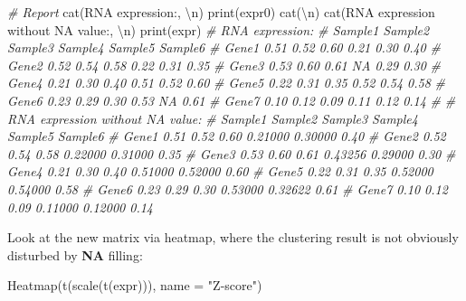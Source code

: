 \documentclass[
  12pt,
]{book}
\newenvironment{Shaded}{\begin{snugshade}}{\end{snugshade}}
\newcommand{\AttributeTok}[1]{\textcolor[rgb]{0.77,0.63,0.00}{#1}}
\newcommand{\CommentTok}[1]{\textcolor[rgb]{0.56,0.35,0.01}{\textit{#1}}}
\newcommand{\FunctionTok}[1]{\textcolor[rgb]{0.00,0.00,0.00}{#1}}
\newcommand{\NormalTok}[1]{#1}
\newcommand{\SpecialCharTok}[1]{\textcolor[rgb]{0.00,0.00,0.00}{#1}}
\newcommand{\StringTok}[1]{\textcolor[rgb]{0.31,0.60,0.02}{#1}}
\begin{document}
\begin{Shaded}
\begin{Highlighting}[]
\CommentTok{\# Report}
\FunctionTok{cat}\NormalTok{(}\StringTok{\textquotesingle{}RNA expression:\textquotesingle{}}\NormalTok{, }\StringTok{\textquotesingle{}}\SpecialCharTok{\textbackslash{}n}\StringTok{\textquotesingle{}}\NormalTok{)}
\FunctionTok{print}\NormalTok{(expr0)}
\FunctionTok{cat}\NormalTok{(}\StringTok{\textquotesingle{}}\SpecialCharTok{\textbackslash{}n}\StringTok{\textquotesingle{}}\NormalTok{)}
\FunctionTok{cat}\NormalTok{(}\StringTok{\textquotesingle{}RNA expression without NA value:\textquotesingle{}}\NormalTok{, }\StringTok{\textquotesingle{}}\SpecialCharTok{\textbackslash{}n}\StringTok{\textquotesingle{}}\NormalTok{)}
\FunctionTok{print}\NormalTok{(expr)}
\CommentTok{\# RNA expression: }
\CommentTok{\#       Sample1 Sample2 Sample3 Sample4 Sample5 Sample6}
\CommentTok{\# Gene1    0.51    0.52    0.60    0.21    0.30    0.40}
\CommentTok{\# Gene2    0.52    0.54    0.58    0.22    0.31    0.35}
\CommentTok{\# Gene3    0.53    0.60    0.61      NA    0.29    0.30}
\CommentTok{\# Gene4    0.21    0.30    0.40    0.51    0.52    0.60}
\CommentTok{\# Gene5    0.22    0.31    0.35    0.52    0.54    0.58}
\CommentTok{\# Gene6    0.23    0.29    0.30    0.53      NA    0.61}
\CommentTok{\# Gene7    0.10    0.12    0.09    0.11    0.12    0.14}
\CommentTok{\# }
\CommentTok{\# RNA expression without NA value: }
\CommentTok{\#       Sample1 Sample2 Sample3 Sample4 Sample5 Sample6}
\CommentTok{\# Gene1    0.51    0.52    0.60 0.21000 0.30000    0.40}
\CommentTok{\# Gene2    0.52    0.54    0.58 0.22000 0.31000    0.35}
\CommentTok{\# Gene3    0.53    0.60    0.61 0.43256 0.29000    0.30}
\CommentTok{\# Gene4    0.21    0.30    0.40 0.51000 0.52000    0.60}
\CommentTok{\# Gene5    0.22    0.31    0.35 0.52000 0.54000    0.58}
\CommentTok{\# Gene6    0.23    0.29    0.30 0.53000 0.32622    0.61}
\CommentTok{\# Gene7    0.10    0.12    0.09 0.11000 0.12000    0.14}
\end{Highlighting}
\end{Shaded}

Look at the new matrix via heatmap, where the clustering result is not obviously disturbed by \textbf{NA} filling:

\begin{Shaded}
\begin{Highlighting}[]
\FunctionTok{Heatmap}\NormalTok{(}\FunctionTok{t}\NormalTok{(}\FunctionTok{scale}\NormalTok{(}\FunctionTok{t}\NormalTok{(expr))), }\AttributeTok{name =} \StringTok{"Z{-}score"}\NormalTok{)}
\end{Highlighting}
\end{Shaded}
\end{document}
